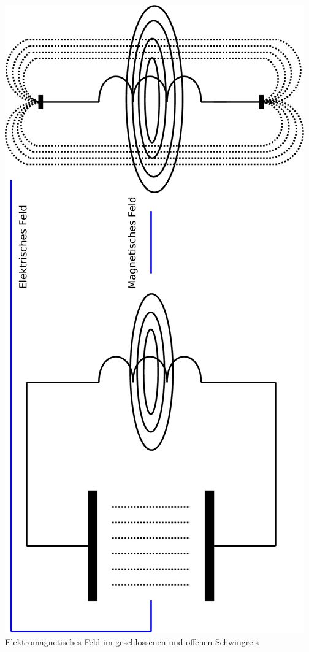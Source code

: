 \begin{frame}
    \centering
    \includegraphics[width=\textwidth,height=1.5\textheight,keepaspectratio,angle=270]{e08/AntSchwingkreis-crop.pdf}\\[1em]
    {\scriptsize Elektromagnetisches Feld im geschlossenen und offenen Schwingreis}
\end{frame}

